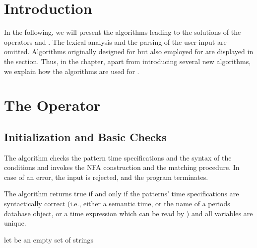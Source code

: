 \IncMargin{3mm}
\LinesNumbered

\section{Introduction}
In the following, we will present the algorithms leading to the solutions of the operators  and . The lexical analysis and the parsing of the user input are omitted. Algorithms originally designed for  but also employed for  are displayed in the  section. Thus, in the  chapter, apart from introducing several new algorithms, we explain how the  algorithms are used for .

\section{The Operator }

\subsection{Initialization and Basic Checks}
The algorithm  checks the pattern time specifications and the syntax of the conditions and invokes the NFA construction and the matching procedure. In case of an error, the input is rejected, and the program terminates.

\begin{algorithm}
  \caption{\label{alg:matches}}
    \;
    \;
    \Return {}\;
\end{algorithm}

The algorithm  returns true if and only if the patterns' time specifications are syntactically correct (i.e., either a semantic time, or the name of a periods database object, or a time expression which can be read by \secondo) and all variables are unique.

\begin{algorithm}
  \caption{\label{alg:verifyPattern}}
    let  be an empty set of strings\;
    \Return {}\;
\end{algorithm}

